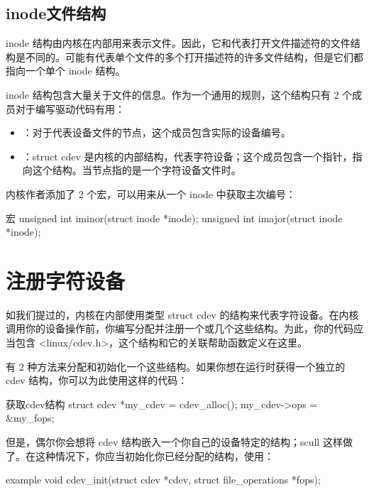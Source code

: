 \documentclass[lang=cn,newtx,10pt,scheme=chinese]{elegantbook}
\begin{document}
\subsection{inode文件结构}

inode 结构由内核在内部用来表示文件。因此，它和代表打开文件描述符的文件结构是不同的。可能有代表单个文件的多个打开描述符的许多文件结构，但是它们都指向一个单个 inode 结构。

inode 结构包含大量关于文件的信息。作为一个通用的规则，这个结构只有 2 个成员对于编写驱动代码有用：

\begin{itemize}
  \item {}：对于代表设备文件的节点，这个成员包含实际的设备编号。
  \item {}：struct cdev 是内核的内部结构，代表字符设备；这个成员包含一个指针，指向这个结构。当节点指的是一个字符设备文件时。
\end{itemize}

内核作者添加了 2 个宏，可以用来从一个 inode 中获取主次编号：

\begin{mycode}{宏}
unsigned int iminor(struct inode *inode);
unsigned int imajor(struct inode *inode);
\end{mycode}

\section{注册字符设备}

如我们提过的，内核在内部使用类型 struct cdev 的结构来代表字符设备。在内核调用你的设备操作前，你编写分配并注册一个或几个这些结构。为此，你的代码应当包含 <linux/cdev.h>，这个结构和它的关联帮助函数定义在这里。

有 2 种方法来分配和初始化一个这些结构。如果你想在运行时获得一个独立的 cdev 结构，你可以为此使用这样的代码：

\begin{mycode}{获取cdev结构}
struct cdev *my_cdev = cdev_alloc();
my_cdev->ops = &my_fops;
\end{mycode}

但是，偶尔你会想将 cdev 结构嵌入一个你自己的设备特定的结构；scull 这样做了。在这种情况下，你应当初始化你已经分配的结构，使用：

\begin{mycode}{example}
    void cdev_init(struct cdev *cdev, struct file_operations *fops);
\end{mycode}
\end{document}
